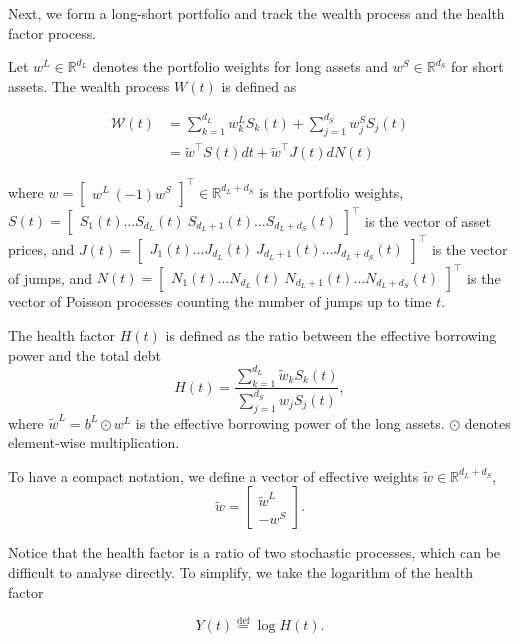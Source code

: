 \documentclass{article} %
\theoremstyle{plain}
\theoremstyle{definition} %
\begin{document}
Next, we form a long-short portfolio and track the wealth process and the health factor process.

Let $w^L \in \mathbb{R}^{d_L}$ denotes the portfolio weights for long assets and $w^S \in \mathbb{R}^{d_S}$ for short assets.
The wealth process $W(t)$ is defined as

\begin{align}
\mathcal{W}(t) &= \sum_{k=1}^{d_L} w_k^L S_k(t) + \sum_{j=1}^{d_S} w_j^S S_j(t) \\
&= \tilde{w}^\top S(t) dt + \tilde{w}^\top J(t) dN(t)
\end{align}

where $w = \begin{bmatrix} w^L \ (-1)w^S \end{bmatrix}^\top \in \mathbb{R}^{d_L + d_S}$ is the portfolio weights,
$S(t) = \begin{bmatrix} S_1(t) \hdots S_{d_L}(t) \ S_{d_L+1}(t) \hdots S_{d_L + d_S}(t) \end{bmatrix}^\top$ is the vector of asset prices, 
and $J(t) = \begin{bmatrix} J_1(t)  \hdots J_{d_L}(t) \ J_{d_L+1}(t) \hdots  J_{d_L + d_S}(t) \end{bmatrix}^\top$ is the vector of jumps, 
and $N(t) = \begin{bmatrix} N_1(t)  \hdots N_{d_L}(t) \ N_{d_L+1}(t) \hdots  N_{d_L + d_S}(t) \end{bmatrix}^\top$ is the vector of Poisson processes counting the number of jumps up to time $t$.

The health factor $H(t)$ is defined as the ratio between the effective borrowing power and the total debt
\[
H(t) = \frac{\sum_{k=1}^{d_L} \tilde{w}_k S_k(t)}{\sum_{j=1}^{d_S} w_j S_j(t)}, 
\]  
where $\tilde{w}^L = b^L \odot w^L$ is the effective borrowing power of the long assets. $\odot$ denotes element-wise multiplication.

To have a compact notation, we define a vector of effective weights $\tilde{w} \in \mathbb{R}^{d_L + d_S}$, 
\[
\tilde{w} = \begin{bmatrix}\tilde{w}^L \\ -w^S\end{bmatrix}.
\]



Notice that the health factor is a ratio of two stochastic processes, which can be difficult to analyse directly. 
To simplify, we take the logarithm of the health factor 

\[Y(t) \overset{\text{def}}{=}\log H(t). \]
\end{document}
